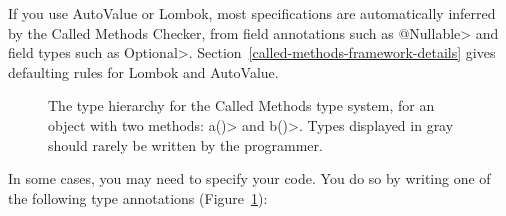 If you use AutoValue or Lombok, most specifications are automatically
inferred by the Called Methods Checker, from field annotations such as
\<@Nullable> and field types such as
\<Optional>. Section~\ref{called-methods-framework-details} gives
defaulting rules for Lombok and AutoValue.

\begin{figure}
\begin{center}
  \hfill
  \hfill
\end{center}
  \caption{The type hierarchy for the Called Methods type system, for an object with two methods: \<a()> and \<b()>.
  Types displayed in gray should rarely be written by the programmer.}
  \label{fig-called-methods-types}
\end{figure}

In some cases, you may need to specify your code. You do so by writing one of the following type
annotations (Figure~\ref{fig-called-methods-types}):
